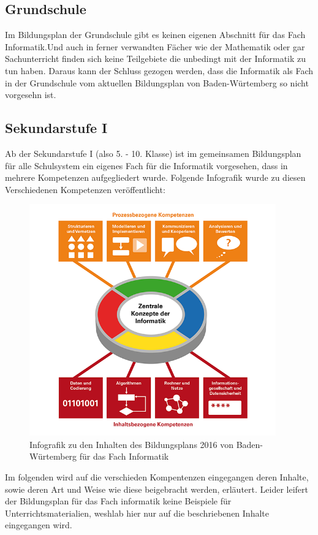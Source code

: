 \subsection{Grundschule}
Im Bildungsplan der Grundschule gibt es keinen eigenen Abschnitt für das Fach Informatik\cite{Fachuebersicht}.Und auch in ferner verwandten Fächer wie der Mathematik\cite{Mathematik} oder gar Sachunterricht\cite{Sachunterricht}  finden sich keine Teilgebiete die unbedingt mit der Informatik zu tun haben. Daraus kann der Schluss gezogen werden, dass die Informatik als Fach in der Grundschule vom aktuellen Bildungsplan von Baden-Würtemberg so nicht vorgesehn ist.

\subsection{Sekundarstufe I}
Ab der Sekundarstufe I (also 5. - 10. Klasse) ist im gemeinsamen Bildungsplan für alle Schulsystem ein eigenes Fach für die Informatik vorgesehen, dass in mehrere Kompetenzen aufgegliedert wurde\cite{Informatik}. Folgende Infografik wurde zu diesen Verschiedenen Kompetenzen veröffentlicht:

\begin{figure}[H]
	\centering
	\includegraphics[width=\textwidth,height=10cm,keepaspectratio]{images/BildungsplanInformatik.png}
	\caption{Infografik zu den Inhalten des Bildungsplans 2016 von Baden-Würtemberg für das Fach Informatik \cite{InfoGra}}
	\label{Bildungsplan Infromatik Infografik}
\end{figure}

Im folgenden wird auf die verschieden Kompentenzen eingegangen deren Inhalte, sowie deren Art und Weise wie diese beigebracht werden, erläutert. Leider leifert der Bildungsplan für das Fach informatik keine Beispiele für Unterrichtsmaterialien, weshlab hier nur auf die beschriebenen Inhalte eingegangen wird.

